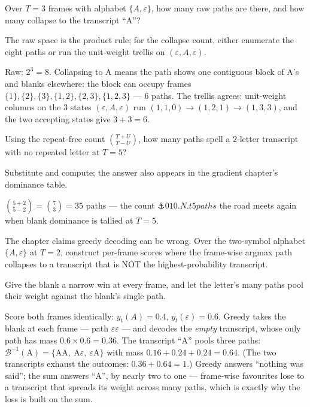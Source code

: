 \begin{problem}
Over $T = 3$ frames with alphabet $\{A, \varepsilon\}$, how many raw
paths are there, and how many collapse to the transcript ``A''?
\begin{hint}
The raw space is the product rule; for the collapse count, either
enumerate the eight paths or run the unit-weight trellis on
$(\varepsilon, A, \varepsilon)$.
\end{hint}
\begin{solution}
Raw: $2^3 = 8$. Collapsing to A means the path shows one contiguous
block of A's and blanks elsewhere: the block can occupy frames
$\{1\},\{2\},\{3\},\{1,2\},\{2,3\},\{1,2,3\}$ — $6$ paths. The
trellis agrees: unit-weight columns on the $3$ states
$(\varepsilon, A, \varepsilon)$ run $(1,1,0) \to (1,2,1) \to (1,3,3)$,
and the two accepting states give $3 + 3 = 6$.
\end{solution}
\end{problem}

\begin{problem}
Using the repeat-free count $\binom{T+U}{T-U}$, how many paths spell a
$2$-letter transcript with no repeated letter at $T = 5$?
\begin{hint}
Substitute and compute; the answer also appears in the gradient
chapter's dominance table.
\end{hint}
\begin{solution}
$\binom{5+2}{5-2} = \binom{7}{3} = 35$ paths — the count
$\anchor{010.N.t5paths}$ the road meets again when blank dominance is
tallied at $T = 5$.
\end{solution}
\end{problem}

\begin{problem}[stretch]
The chapter claims greedy decoding can be wrong. Over the two-symbol
alphabet $\{A, \varepsilon\}$ at $T = 2$, construct per-frame scores
where the frame-wise argmax path collapses to a transcript that is NOT
the highest-probability transcript.
\begin{hint}
Give the blank a narrow win at every frame, and let the letter's many
paths pool their weight against the blank's single path.
\end{hint}
\begin{solution}
Score both frames identically: $y_t(A) = 0.4$,
$y_t(\varepsilon) = 0.6$. Greedy takes the blank at each frame —
path $\varepsilon\varepsilon$ — and decodes the \emph{empty}
transcript, whose only path has mass $0.6 \times 0.6 = 0.36$. The
transcript ``A'' pools three paths:
$\mathcal{B}^{-1}(\mathrm{A}) = \{\mathrm{AA},\
\mathrm{A}\varepsilon,\ \varepsilon\mathrm{A}\}$ with mass
$0.16 + 0.24 + 0.24 = 0.64$. (The two transcripts exhaust the
outcomes: $0.36 + 0.64 = 1$.) Greedy answers ``nothing was said'';
the sum answers ``A'', by nearly two to one — frame-wise favourites
lose to a transcript that spreads its weight across many paths,
which is exactly why the loss is built on the sum.
\end{solution}
\end{problem}
